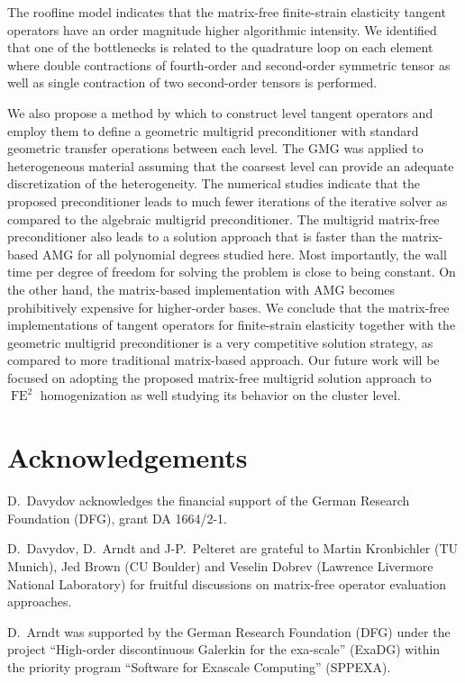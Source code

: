 \documentclass[times,doublespace]{nmeauth}
\begin{document}
The roofline model indicates that the matrix-free finite-strain elasticity tangent operators have an order magnitude higher algorithmic intensity.
We identified that one of the bottlenecks is related to the quadrature loop on each element where double contractions of fourth-order and second-order symmetric tensor
as well as single contraction of two second-order tensors is performed.

We also propose a method by which to construct level tangent operators and employ them to define a geometric multigrid preconditioner
with standard geometric transfer operations between each level.
The GMG was applied to heterogeneous material assuming that the coarsest level can provide an adequate discretization of the heterogeneity.
The numerical studies indicate that the proposed preconditioner
leads to much fewer iterations of the iterative solver as compared to the algebraic multigrid preconditioner.
The multigrid matrix-free preconditioner also
leads to a solution approach that is faster than the matrix-based AMG for all polynomial degrees studied here.
Most importantly, the wall time per degree of freedom for solving the problem is close to being constant.
On the other hand, the matrix-based implementation with AMG becomes prohibitively expensive for higher-order bases.
We conclude that the matrix-free implementations of tangent operators for finite-strain elasticity together with
the geometric multigrid preconditioner is a very competitive solution strategy, as compared to more traditional matrix-based approach.
Our future work will be focused on adopting the proposed matrix-free multigrid solution approach to $\operatorname{FE}^2$ homogenization
as well studying its behavior on the cluster level.

\ifijnme
\acks
\else
\section*{Acknowledgements}
\fi

D.~Davydov acknowledges the financial support of the German Research Foundation (DFG), grant DA 1664/2-1.

D.~Davydov, D.~Arndt and J-P.~Pelteret are grateful to Martin Kronbichler (TU Munich), Jed Brown (CU Boulder) and Veselin Dobrev (Lawrence Livermore National Laboratory) for fruitful discussions on matrix-free operator evaluation approaches.

D.~Arndt was supported by the German Research Foundation (DFG) under the project ``High-order discontinuous
Galerkin for the exa-scale'' (\mbox{ExaDG}) within the priority program ``Software
for Exascale Computing'' (SPPEXA).
\end{document}
